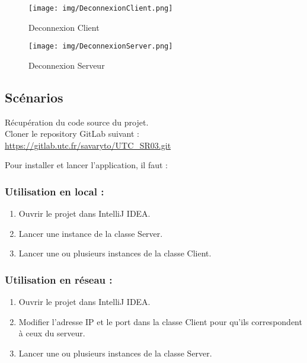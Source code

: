 \documentclass[
]{article}
\providecommand{\tightlist}{%
  \setlength{\itemsep}{0pt}\setlength{\parskip}{0pt}}
\begin{document}
\begin{figure}[H]
\centering
\texttt{[image: img/DeconnexionClient.png]}
\caption{Deconnexion Client}
\end{figure}

\begin{figure}[H]
\centering
\texttt{[image: img/DeconnexionServer.png]}
\caption{Deconnexion Serveur}
\end{figure}

\pagebreak

\hypertarget{scuxe9narios}{%
\subsection{Scénarios}\label{scuxe9narios}}

Récupération du code source du projet.\\
Cloner le repository GitLab suivant : \url{https://gitlab.utc.fr/savaryto/UTC_SR03.git}

Pour installer et lancer l'application, il faut :

\hypertarget{utilisation-en-local}{%
\subsubsection{Utilisation en local :}\label{utilisation-en-local}}

\begin{enumerate}
\def\labelenumi{\arabic{enumi}.}
\tightlist
\item
  Ouvrir le projet dans IntelliJ IDEA.
\item
  Lancer une instance de la classe Server.
\item
  Lancer une ou plusieurs instances de la classe Client.
\end{enumerate}

\hypertarget{utilisation-en-ruxe9seau}{%
\subsubsection{Utilisation en réseau :}\label{utilisation-en-ruxe9seau}}

\begin{enumerate}
\def\labelenumi{\arabic{enumi}.}
\tightlist
\item
  Ouvrir le projet dans IntelliJ IDEA.
\item
  Modifier l'adresse IP et le port dans la classe Client pour qu'ils
  correspondent à ceux du serveur.
\item
  Lancer une ou plusieurs instances de la classe Server.
\end{enumerate}
\end{document}
